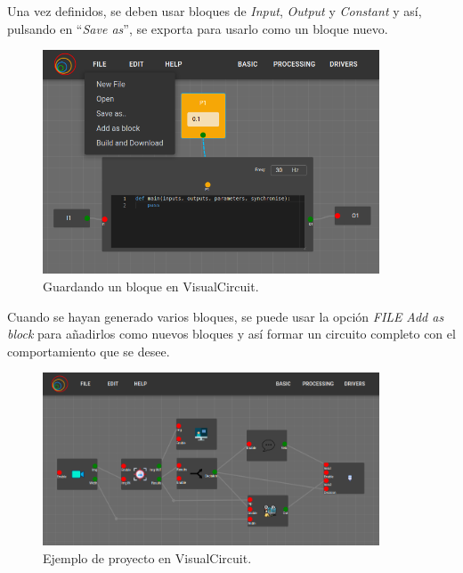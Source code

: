 Una vez definidos, se deben usar bloques de \textit{Input}, \textit{Output} y \textit{Constant} y así, pulsando en ``\textit{Save as}'',
se exporta para usarlo como un bloque nuevo.
\begin{figure} [H]
  \begin{center}
      \includegraphics[width=10cm]{figs/c4/VC_saveas.png}
  \end{center}
  \caption[Guardando un bloque en VisualCircuit]{Guardando un bloque en VisualCircuit.}
  \label{fig:VC_saveas_bloque}
\end{figure}

Cuando se hayan generado varios bloques, se puede usar la opción \textit{FILE} \overrightarrow{ } \textit{Add as block} para añadirlos como nuevos bloques
y así formar un circuito completo con el comportamiento que se desee.
\begin{figure} [H]
  \begin{center}
      \includegraphics[width=10cm]{figs/c4/VC_example.png}
  \end{center}
  \caption[Ejemplo de proyecto en VisualCircuit]{Ejemplo de proyecto en VisualCircuit.}
  \label{fig:VC_example}
\end{figure}







